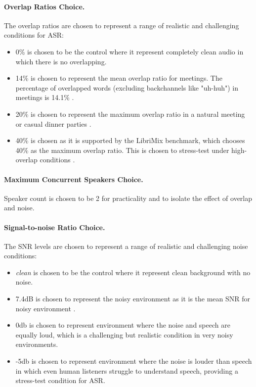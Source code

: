 \paragraph{Overlap Ratios Choice.} The overlap ratios are chosen to represent a range of realistic and challenging conditions for ASR:
\begin{itemize}
    \item 0\% is chosen to be the control where it represent completely clean audio in which there is no overlapping.
    \item 14\% is chosen to represent the mean overlap ratio for meetings. The percentage of overlapped words (excluding backchannels like "uh-huh") in meetings is 14.1\% \cite{Shriberg2001ObservationsOO}.
    \item 20\% is chosen to represent the maximum overlap ratio in a natural meeting or casual dinner parties \cite{chen2020continuousspeechseparationdataset} \cite{cosentino2020librimixopensourcedatasetgeneralizable}.
    \item 40\% is chosen as it is supported by the LibriMix benchmark, which chooses 40\% as the maximum overlap ratio. This is chosen to stress-test under high-overlap conditions \cite{chen2020continuousspeechseparationdataset}.
\end{itemize}

\paragraph{Maximum Concurrent Speakers Choice.} Speaker count is chosen to be 2 for practicality and to isolate the effect of overlap and noise.

\paragraph{Signal-to-noise Ratio Choice.} The SNR levels are chosen to represent a range of realistic and challenging noise conditions:
\begin{itemize}
    \item \textit{clean} is chosen to be the control where it represent clean background with no noise.
    \item 7.4dB is chosen to represent the noisy environment as it is the mean SNR for noisy environment \cite{wu2018characteristics}.
    \item 0db is chosen to represent environment where the noise and speech are equally loud, which is a challenging but realistic condition in very noisy environments.
    \item -5db is chosen to represent environment where the noise is louder than speech in which even human listeners struggle to understand speech, providing a stress-test condition for ASR.
\end{itemize}

